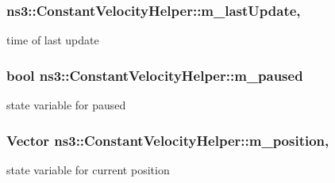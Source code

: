 \subsubsection[{\texorpdfstring{m\+\_\+last\+Update}{m_lastUpdate}}]{ ns3\+::\+Constant\+Velocity\+Helper\+::m\+\_\+last\+Update\hspace{0.3cm}{\ttfamily [mutable]}, {\ttfamily [private]}}\hypertarget{classns3_1_1ConstantVelocityHelper_a0dde79b8e505b6cb2ae16e550d5cdfaf}{}\label{classns3_1_1ConstantVelocityHelper_a0dde79b8e505b6cb2ae16e550d5cdfaf}


time of last update 

\subsubsection[{\texorpdfstring{m\+\_\+paused}{m_paused}}]{\setlength{\rightskip}{0pt plus 5cm}bool ns3\+::\+Constant\+Velocity\+Helper\+::m\+\_\+paused\hspace{0.3cm}{\ttfamily [private]}}\hypertarget{classns3_1_1ConstantVelocityHelper_aff695de58e267b167ef58e1ae9155720}{}\label{classns3_1_1ConstantVelocityHelper_aff695de58e267b167ef58e1ae9155720}


state variable for paused 

\subsubsection[{\texorpdfstring{m\+\_\+position}{m_position}}]{\setlength{\rightskip}{0pt plus 5cm}Vector ns3\+::\+Constant\+Velocity\+Helper\+::m\+\_\+position\hspace{0.3cm}{\ttfamily [mutable]}, {\ttfamily [private]}}\hypertarget{classns3_1_1ConstantVelocityHelper_a2961dff788750be98c75f6e4ff7a46b0}{}\label{classns3_1_1ConstantVelocityHelper_a2961dff788750be98c75f6e4ff7a46b0}


state variable for current position 


